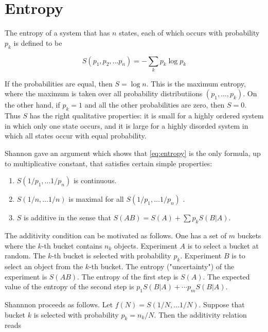 

\section{Entropy}

The entropy of a system that has $n$ states, each of which occurs with probability $p_k$ is defined to be

\begin{equation}
\label{eq:entropy}
S(p_1, p_2, \ldots p_n) = - \sum_k p_k \log p_k
\end{equation}

If the probabilities are equal, then $S = \log n$.  This is the maximum entropy, where the maximum is taken over all probability distributiions $(p_1, \ldots , p_k)$.  On the other hand, if $p_k  = 1$ and all the other probabilities are zero, then $S = 0$.  Thus $S$ has the right qualitative properties: it is small for a highly ordered system in which only one state occurs, and it is large for a highly disorded system in which all states occur with equal probability.

Shannon gave an argument which shows that \eqref{eq:entropy} is the
only formula, up to multiplicative constant, that satisfies certain simple properties:

\begin{enumerate}


\item $S(1/p_1, \ldots 1/p_n)$  is continuous.

\item $S(1/n, \ldots 1/n) $ is maximal for all $S(1/p_1, \ldots 1/p_n)$ .

\item $S$ is additive in the sense that
$S(AB) = S(A) + \sum p_kS(B|A)$.

\end{enumerate}

The additivity condition can be motivated as follows. One has a set of $m$ buckets where the $k$-th bucket contains $n_k$ objects.  Experiment $A$ is to select a bucket at random.  The $k$-th bucket is selected with probability $p_k$.  Experiment $B$ is to select an object from the $k$-th bucket. The entropy ("uncertainty") of the experiment is $S(AB)$.  The entropy of the first step is $S(A)$.  The expected value of the entropy of the second step is $p_1S(B|A) + \cdots p_mS(B|A)$.

Shannnon proceeds as follows.  Let $f(N) = S(1/N, \ldots 1/N)$.  Suppose that bucket $k$ is selected with probability $p_k = n_k/N$.  Then the additivity relation reads

